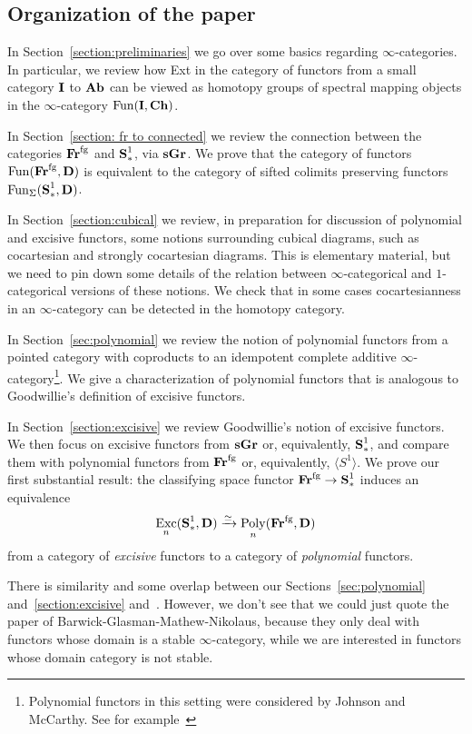 \documentclass[psamsfonts]{amsart}
\theoremstyle{plain}
\theoremstyle{definition}
\theoremstyle{remark}
\newcommand{\catname}[1]{{\normalfont\textbf{#1}}}
\newcommand{\circles}{\langle S^1 \rangle}
\newcommand{\spaces}{\catname{S}_*}
\newcommand{\connected}{\spaces^{1}}
\newcommand{\fr}{\allfr^{\mathrm{fg}}}
\newcommand{\allfr}{\catname{Fr}}
\newcommand{\ab}{\catname{Ab}}
\newcommand{\ch}{\catname{Ch}}
\newcommand{\sgr}{\catname{sGr}}
\DeclareMathOperator{\fun}{Fun}
\DeclareMathOperator{\poly}{Poly}
\DeclareMathOperator{\exc}{Exc}
\begin{document}
\subsection*{Organization of the paper}
In Section~\ref{section:preliminaries} we go over some basics regarding $\infty$-categories. In particular, we review how Ext in the category of functors from a small category $\catname{I}$ to $\ab$ can be viewed as homotopy groups of spectral mapping objects in the $\infty$-category $\fun(\catname{I}, \ch)$.

In Section~\ref{section: fr to connected} we review the connection between the categories $\fr$ and $\connected$, via $\sgr$. We prove that the category of functors $\fun(\fr, \catname{D})$ is equivalent to the category of sifted colimits preserving functors $\fun_{\Sigma}(\connected, \catname{D})$.

In Section~\ref{section:cubical} we review, in preparation for discussion of polynomial and excisive functors, some notions surrounding cubical diagrams, such as cocartesian and strongly cocartesian diagrams. This is elementary material, but we need to pin down some details of the relation between $\infty$-categorical and $1$-categorical versions of these notions. We check that in some cases cocartesianness in an $\infty$-category can be detected in the homotopy category.

In Section~\ref{sec:polynomial} we review the notion of polynomial functors from a pointed category with coproducts to an idempotent complete additive $\infty$-category\footnote{Polynomial functors in this setting were considered by Johnson and McCarthy. See for example~\cite{JM03}}. We give a characterization of polynomial functors that is analogous to Goodwillie's definition of excisive functors.

In Section~\ref{section:excisive} we review Goodwillie's notion of excisive functors. We then focus on excisive functors from $\sgr$ or, equivalently, $\connected$, and compare them with polynomial functors from $\fr$ or, equivalently, $\circles$. We prove our first substantial result: the classifying space functor $\fr\to \connected$ induces an equivalence
\[
\exc_n(\connected, \catname{D})\xrightarrow{\simeq}\poly_n(\fr, \catname{D})
\]
from a category of \emph{excisive} functors to a category of \emph{polynomial} functors.

There is similarity and some overlap between our Sections~\ref{sec:polynomial} and~\ref{section:excisive} and~\cite[Section 2]{Barwick-Glasman-Mathew-Nikolaus}. However, we don't see that we could just quote the paper of Barwick-Glasman-Mathew-Nikolaus, because they only deal with functors whose domain is a stable $\infty$-category, while we are interested in functors whose domain category is not stable.
\end{document}
